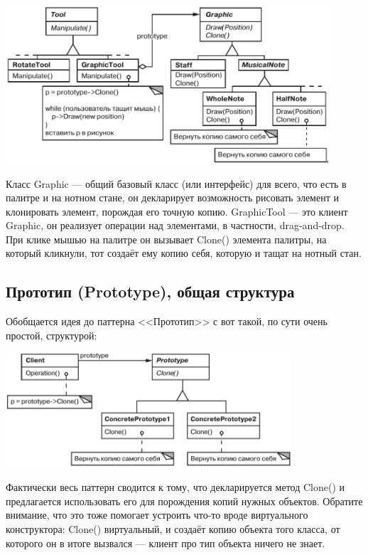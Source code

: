 \documentclass{../../text-style}
\begin{document}
\begin{center}
    \includegraphics[width=0.9\textwidth]{musicalEditor.png}
\end{center}

Класс Graphic --- общий базовый класс (или интерфейс) для всего, что есть в палитре и на нотном стане, он декларирует возможность рисовать элемент и клонировать элемент, порождая его точную копию. GraphicTool --- это клиент Graphic, он реализует операции над элементами, в частности, drag-and-drop. При клике мышью на палитре он вызывает Clone() элемента палитры, на который кликнули, тот создаёт ему копию себя, которую и тащат на нотный стан.

\subsection{Прототип (Prototype), общая структура}

Обобщается идея до паттерна <<Прототип>> с вот такой, по сути очень простой, структурой:

\begin{center}
    \includegraphics[width=0.8\textwidth]{prototype.png}
\end{center}

Фактически весь паттерн сводится к тому, что декларируется метод Clone() и предлагается использовать его для порождения копий нужных объектов. Обратите внимание, что это тоже помогает устроить что-то вроде виртуального конструктора: Clone() виртуальный, и создаёт копию объекта того класса, от которого он в итоге вызвался --- клиент про тип объекта ничего не знает.
\end{document}
